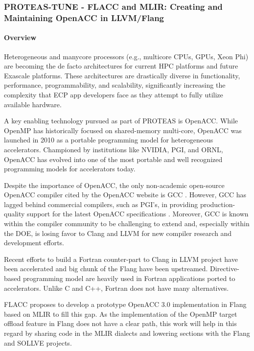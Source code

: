 \subsubsection{ PROTEAS-TUNE - FLACC and MLIR: Creating and Maintaining OpenACC in LLVM/Flang}\label{s:flacc}

\paragraph{Overview}
Heterogeneous and manycore processors (e.g., multicore CPUs, GPUs,
Xeon Phi) are becoming the de facto architectures for current
HPC platforms and future Exascale platforms.  These architectures are
drastically diverse in functionality, performance, programmability,
and scalability, significantly increasing the complexity that ECP app
developers face as they attempt to fully utilize available hardware.

A key enabling technology pursued as part of PROTEAS is OpenACC.
While OpenMP has historically focused on shared-memory multi-core,
OpenACC was launched in 2010 as a portable programming model for
heterogeneous accelerators.  Championed by institutions like NVIDIA,
PGI, and ORNL, OpenACC has evolved into one of the most portable and
well recognized programming models for accelerators today.

Despite the importance of OpenACC, the only non-academic open-source OpenACC
compiler cited by the OpenACC website is GCC \cite{openaccOrgTools}.
However, GCC has lagged behind commercial compilers, such as PGI's, in
providing production-quality support for the latest OpenACC specifications
\cite{openACCValidationSuite}.  Moreover, GCC is known within the compiler
community to be challenging to extend and, especially within the DOE, is
losing favor to Clang and LLVM for new compiler research and development
efforts.

Recent efforts to build a Fortran counter-part to Clang in LLVM project have
been accelerated and big chunk of the Flang have been upstreamed.
Directive-based programming model are heavily used in Fortran applications ported
to accelerators. Unlike C and C++, Fortran does not have many alternatives.

FLACC proposes to develop a prototype OpenACC 3.0 implementation in Flang based
on MLIR to fill this gap. As the implementation of the OpenMP target offload
feature in Flang does not have a clear path, this work will help in this regard
by sharing code in the MLIR dialects and lowering sections with the Flang and
SOLLVE projects.

